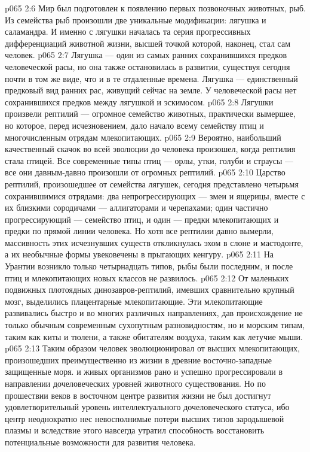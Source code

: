 \vs p065 2:6 \pc Мир был подготовлен к появлению первых позвоночных животных, рыб. Из семейства рыб произошли две уникальные модификации: лягушка и саламандра. И именно с лягушки началась та серия прогрессивных дифференциаций животной жизни, высшей точкой которой, наконец, стал сам человек.
\vs p065 2:7 Лягушка --- один из самых ранних сохранившихся предков человеческой расы, но она также остановилась в развитии, существуя сегодня почти в том же виде, что и в те отдаленные времена. Лягушка --- единственный предковый вид ранних рас, живущий сейчас на земле. У человеческой расы нет сохранившихся предков между лягушкой и эскимосом.
\vs p065 2:8 \pc Лягушки произвели рептилий --- огромное семейство животных, практически вымершее, но которое, перед исчезновением, дало начало всему семейству птиц и многочисленным отрядам млекопитающих.
\vs p065 2:9 Вероятно, наибольший качественный скачок во всей эволюции до человека произошел, когда рептилия стала птицей. Все современные типы птиц --- орлы, утки, голуби и страусы --- все они давным\hyp{}давно произошли от огромных рептилий.
\vs p065 2:10 Царство рептилий, произошедшее от семейства лягушек, сегодня представлено четырьмя сохранившимися отрядами: два непрогрессирующих --- змеи и ящерицы, вместе с их близкими сородичами --- аллигаторами и черепахами; один частично прогрессирующий --- семейство птиц, и один --- предки млекопитающих и предки по прямой линии человека. Но хотя все рептилии давно вымерли, массивность этих исчезнувших существ откликнулась эхом в слоне и мастодонте, а их необычные формы увековечены в прыгающих кенгуру.
\vs p065 2:11 \pc На Урантии возникло только четырнадцать типов, рыбы были последним, и после птиц и млекопитающих новых классов не развилось.
\vs p065 2:12 \pc От маленьких подвижных плотоядных динозавров\hyp{}рептилий, имевших сравнительно крупный мозг,  выделились плацентарные млекопитающие. Эти млекопитающие развивались быстро и во многих различных направлениях, дав происхождение не только обычным современным сухопутным разновидностям, но и морским типам, таким как киты и тюлени, а также обитателям воздуха, таким как летучие мыши.
\vs p065 2:13 Таким образом человек эволюционировал от высших млекопитающих, произошедших преимущественно из  жизни в древние восточно\hyp{}западные защищенные моря.  и  живых организмов рано и успешно прогрессировали в направлении дочеловеческих уровней животного существования. Но по прошествии веков в восточном центре развития жизни не был достигнут удовлетворительный уровень интеллектуального дочеловеческого статуса, ибо центр неоднократно нес невосполнимые потери высших типов зародышевой плазмы и вследствие этого навсегда утратил способность восстановить потенциальные возможности для развития человека.
